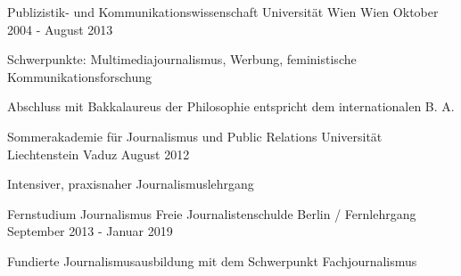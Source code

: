 

\begin{cventries}

  \cventry
    {Publizistik- und Kommunikationswissenschaft} %
    {Universität Wien} %
    {Wien} %
    {Oktober 2004 - August 2013} %
    {
      \begin{cvitems} %
        \item {Schwerpunkte: Multimediajournalismus, Werbung, feministische Kommunikationsforschung}
        \item {Abschluss mit Bakkalaureus der Philosophie entspricht dem internationalen B. A.}
      \end{cvitems}
    }

    \cventry
    {Sommerakademie für Journalismus und Public Relations} %
    {Universität Liechtenstein} %
    {Vaduz} %
    {August 2012} %
    {
      \begin{cvitems} %
        \item {Intensiver, praxisnaher Journalismuslehrgang}
      \end{cvitems}
    }

    \cventry
    {Fernstudium Journalismus} %
    {Freie Journalistenschulde} %
    {Berlin / Fernlehrgang} %
    {September 2013 - Januar 2019} %
    {
      \begin{cvitems} %
        \item {Fundierte Journalismusausbildung mit dem Schwerpunkt Fachjournalismus}
      \end{cvitems}
    }

  


\end{cventries}
